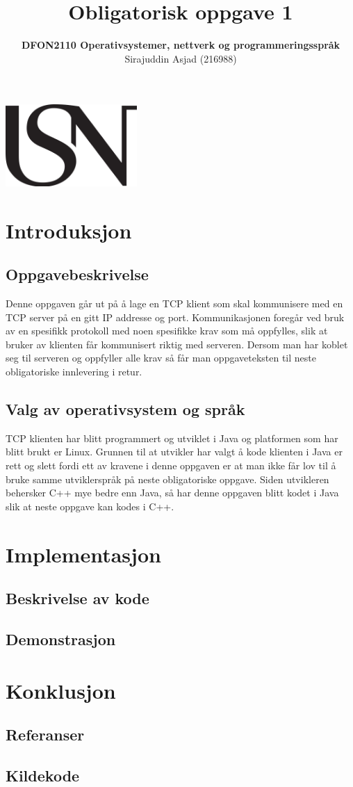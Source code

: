 \documentclass{article}
\title{\textbf{Obligatorisk oppgave 1}}
\author{\textbf{DFON2110 Operativsystemer, nettverk og programmeringsspråk}\\Sirajuddin Asjad (216988)}
\date{}
\begin{document}
	\begin{center}
		\includegraphics[width=5cm]{usn}
	\end{center}
	{\let\newpage\relax\maketitle}
	
	\newpage
	\renewcommand{\contentsname}{Innholdsfortegnelse}
	\tableofcontents
	
	\newpage
	\section{Introduksjon}
		\subsection{Oppgavebeskrivelse}
			Denne oppgaven går ut på å lage en TCP klient som skal kommunisere med en TCP server på en gitt IP addresse og port. Kommunikasjonen foregår ved bruk av en spesifikk protokoll med noen spesifikke krav som må oppfylles, slik at bruker av klienten får kommunisert riktig med serveren. Dersom man har koblet seg til serveren og oppfyller alle krav så får man oppgaveteksten til neste obligatoriske innlevering i retur.

		\subsection{Valg av operativsystem og språk}
			TCP klienten har blitt programmert og utviklet i Java og platformen som har blitt brukt er Linux. Grunnen til at utvikler har valgt å kode klienten i Java er rett og slett fordi ett av kravene i denne oppgaven er at man ikke får lov til å bruke samme utviklerspråk på neste obligatoriske oppgave. Siden utvikleren behersker C++ mye bedre enn Java, så har denne oppgaven blitt kodet i Java slik at neste oppgave kan kodes i C++.


	\newpage
	\section{Implementasjon}
		\subsection{Beskrivelse av kode}
		\subsection{Demonstrasjon}

	\newpage
	\section{Konklusjon}
		\subsection{Referanser}
		\subsection{Kildekode}
\end{document}
